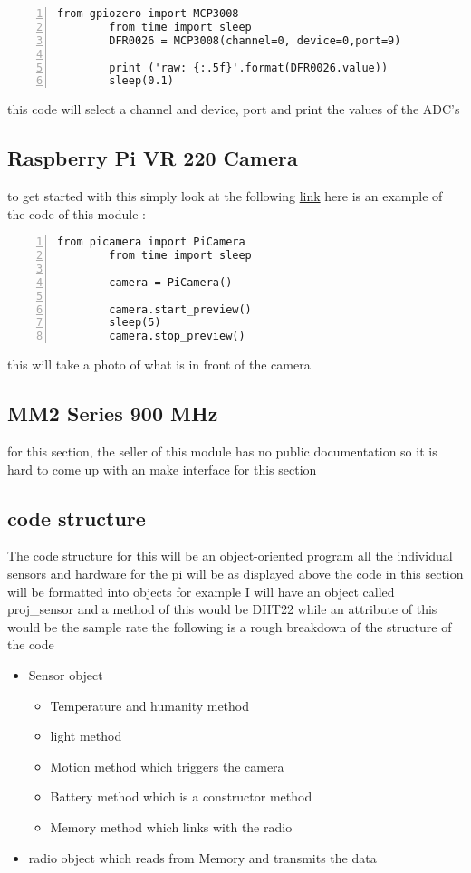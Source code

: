 	\label{adc code}
	\begin{lstlisting}[style=mystyle,caption={ADC code},numbers=left,firstnumber=1]
		from gpiozero import MCP3008
		from time import sleep
		DFR0026 = MCP3008(channel=0, device=0,port=9)
	
		print ('raw: {:.5f}'.format(DFR0026.value))
		sleep(0.1)
	\end{lstlisting}
	this code will select a  channel and device, port and  print the values of the ADC's
	\subsection{Raspberry Pi VR 220 Camera}
	to get started with this simply look at the following \href{https://projects.raspberrypi.org/en/projects/getting-started-with-picamera/4}{link}
	here is an example of the code of this module :
	\begin{lstlisting}[style=mystyle,caption={example code for camera},numbers=left,firstnumber=1]
		from picamera import PiCamera
		from time import sleep

		camera = PiCamera()

		camera.start_preview()
		sleep(5)
		camera.stop_preview()
	\end{lstlisting}
	this will  take a photo of what is in front of the  camera

	\subsection{MM2 Series 900 MHz}
	for this section, the seller of this module has no public  documentation so it is hard to  come up with  an make interface for  this section   
	\subsection{code structure}
	The code structure for this  will be an object-oriented program all the individual sensors and  hardware  for the pi will be as displayed above the code in this section will be formatted into objects for example I will have an  object   called proj\_sensor and  a method of this  would be  DHT22 while an attribute of this would  be  the  sample rate
	the following is a  rough breakdown of the  structure of the code
	\begin{itemize}
		\item Sensor object
		
		\begin{itemize}
			\item Temperature and humanity method
			\item light method
			\item Motion method which triggers the camera
			\item Battery method which is a constructor method
			\item Memory method which  links with the radio 
		
		\end{itemize}
		
		\item radio object which reads from Memory and  transmits the data 
	
	\end{itemize}
